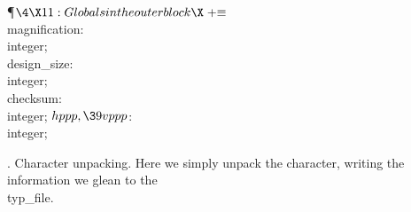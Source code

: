 \Y\P$\4\X11:Globals in the outer block\X\mathrel{+}\S$\6
\4\\{magnification}: \\{integer};\6
\4\\{design\_size}: \\{integer};\6
\4\\{checksum}: \\{integer};\6
\4$\\{hppp},\39\\{vppp}$: \\{integer};\par
\fi

.  Character unpacking.
Here we simply unpack the character, writing the information we glean to the
\\{typ\_file}.

